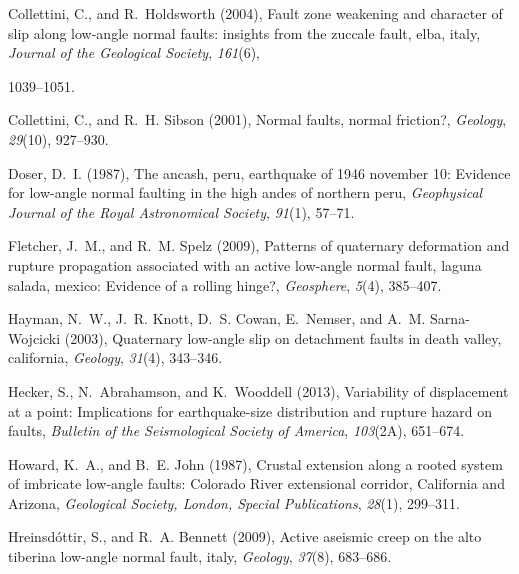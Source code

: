 \documentclass[twocolumn,grl]{AGUTeX}
\begin{document}
\begin{article}
\begin{thebibliography}{29}
Collettini, C., and R.~Holdsworth (2004), Fault zone weakening and character of
  slip along low-angle normal faults: insights from the zuccale fault, elba,
  italy, \textit{Journal of the Geological Society}, \textit{161}(6),

  1039--1051.

Collettini, C., and R.~H. Sibson (2001), Normal faults, normal friction?,
  \textit{Geology}, \textit{29}(10), 927--930.

Doser, D.~I. (1987), The ancash, peru, earthquake of 1946 november 10: Evidence
  for low-angle normal faulting in the high andes of northern peru,
  \textit{Geophysical Journal of the Royal Astronomical Society},
  \textit{91}(1), 57--71.

Fletcher, J.~M., and R.~M. Spelz (2009), Patterns of quaternary deformation and
  rupture propagation associated with an active low-angle normal fault, laguna
  salada, mexico: Evidence of a rolling hinge?, \textit{Geosphere},
  \textit{5}(4), 385--407.

Hayman, N.~W., J.~R. Knott, D.~S. Cowan, E.~Nemser, and A.~M. Sarna-Wojcicki
  (2003), Quaternary low-angle slip on detachment faults in death valley,
  california, \textit{Geology}, \textit{31}(4), 343--346.

Hecker, S., N.~Abrahamson, and K.~Wooddell (2013), Variability of displacement
  at a point: Implications for earthquake-size distribution and rupture hazard
  on faults, \textit{Bulletin of the Seismological Society of America},
  \textit{103}(2A), 651--674.

Howard, K.~A., and B.~E. John (1987), Crustal extension along a rooted system
  of imbricate low-angle faults: {Colorado River} extensional corridor,
  {California} and {Arizona}, \textit{Geological Society, London, Special
  Publications}, \textit{28}(1), 299--311.

Hreinsd{\'o}ttir, S., and R.~A. Bennett (2009), Active aseismic creep on the
  alto tiberina low-angle normal fault, italy, \textit{Geology},
  \textit{37}(8), 683--686.


\end{thebibliography}
\end{article}
\end{document}
